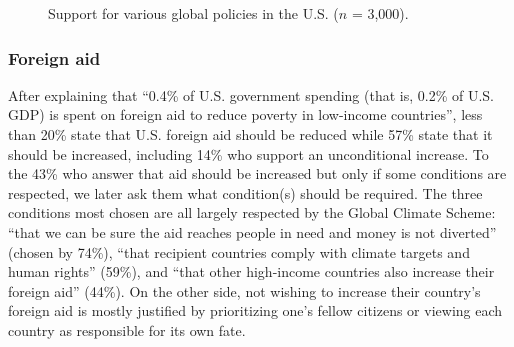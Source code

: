 \begin{figure}
  \caption{Support for various global policies in the U.S. ($n$ = 3,000).}
  \label{fig:support}
\end{figure}

\subsubsection{Foreign aid} %
After explaining that ``0.4\% of U.S. government spending (that is, 0.2\% of U.S. GDP) is spent on foreign aid to reduce poverty in low-income countries'', less than 20\% state that U.S. foreign aid should be reduced while 57\% state that it should be increased, including 14\% who support an unconditional increase. To the 43\% who answer that aid should be increased but only if some conditions are respected, we later ask them what condition(s) should be required. The three conditions most chosen are all largely respected by the Global Climate Scheme: ``that we can be sure the aid reaches people in need and money is not diverted'' (chosen by 74\%), ``that recipient countries comply with climate targets and human rights'' (59\%), and ``that other high-income countries also increase their foreign aid'' (44\%). %
On the other side, not wishing to increase their country's foreign aid is mostly justified by prioritizing one's fellow citizens or viewing each country as responsible for its own fate. 

